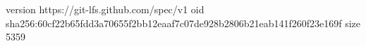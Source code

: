 version https://git-lfs.github.com/spec/v1
oid sha256:60cf22b65fdd3a70655f2bb12eaaf7c07de928b2806b21eab141f260f23e169f
size 5359
